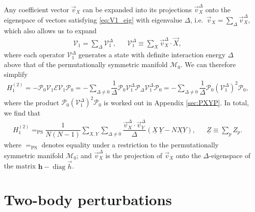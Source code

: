 \documentclass[nofootinbib,notitlepage,11pt]{revtex4-2}
\newcommand{\f}[2]{\dfrac{#1}{#2}} %
\newcommand{\p}[1]{\left(#1\right)} %
\renewcommand{\c}{\cdot} %
\newcommand{\m}{\bm} %
\renewcommand{\v}{\vec} %
\newcommand{\1}{\mathds{1}}
\newcommand{\E}{\mathcal{E}}
\newcommand{\M}{\mathcal{M}}
\renewcommand{\P}{\mathcal{P}}
\newcommand{\V}{\mathcal{V}}
\newcommand{\EQPS}{=_{\text{PS}}}
\newcommand{\col}{\underline}
\DeclareMathOperator{\diag}{diag}
\begin{document}
Any coefficient vector $\v v_X$ can be expanded into its projections
$\v v_X^\Delta$ onto the eigenspace of vectors satisfying
\eqref{eq:V1_eig} with eigenvalue $\Delta$,
i.e.~$\v v_X = \sum_\Delta \v v_X^\Delta$, which also allows us to
expand
\begin{align}
  \V_1 = \sum_\Delta \V_1^\Delta,
  &&
  \V_1^\Delta \equiv \sum_X \v v_X^\Delta \c \v X,
\end{align}
where each operator $\V_1^\Delta$ generates a state with definite
interaction energy $\Delta$ above that of the permutationally
symmetric manifold $\M_0$.  We can therefore simplify
\begin{align}
  H_1^{(2)}
  = - \P_0 \V_1 \E \V_1 \P_0
  = - \sum_{\Delta\ne0} \f1{\Delta}
  \P_0 \V_1^\Delta \P_\Delta \V_1^\Delta \P_0
  = - \sum_{\Delta\ne0} \f1{\Delta} \P_0 \p{\V_1^\Delta}^2 \P_0,
\end{align}
where the product $\P_0 \p{\V_1^\Delta}^2 \P_0$ is worked out in
Appendix \ref{sec:PXYP}.  In total, we find that
\begin{align}
  H_1^{(2)}
  \EQPS \f1{N\p{N-1}} \sum_{X,Y} \sum_{\Delta\ne0}
  \f{\v v_X^\Delta\c\v v_Y^\Delta}{\Delta}
  \p{\col{X}\,\col{Y} - N \col{XY}},
  &&
  \col{Z} \equiv \sum_p Z_p.
  \label{eq:H_1_2}
\end{align}
where $\EQPS$ denotes equality under a restriction to the
permutationally symmetric manifold $\M_0$; and $\v v_X^\Delta$ is the
projection of $\v v_X$ onto the $\Delta$-eigenspace of the matrix
$\m h-\diag\v h$.

\section{Two-body perturbations}
\label{sec:two_body_pert}
\end{document}
